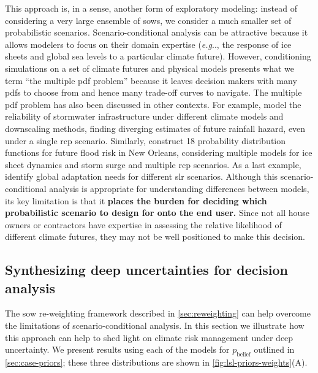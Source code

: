 \documentclass{agujournal2019}
\makeatletter
\DeclareRobustCommand\onedot{\futurelet\@let@token\@onedot}
\def\@onedot{\ifx\@let@token.\else.\null\fi\xspace}
\def\eg{\emph{e.g}\onedot} \def\Eg{\emph{E.g}\onedot}
\makeatother
\begin{document}
This approach is, in a sense, another form of exploratory modeling: instead of considering a very large ensemble of \glspl{sow}, we consider a much smaller set of probabilistic scenarios.
Scenario-conditional analysis can be attractive because it allows modelers to focus on their domain expertise (\eg, the response of ice sheets and global sea levels to a particular climate future).
However, conditioning simulations on a set of climate futures and physical models presents what we term ``the multiple \gls{pdf} problem'' because it leaves decision makers with many \glspl{pdf} to choose from and hence many trade-off curves to navigate.
The multiple \gls{pdf} problem has also been discussed in other contexts.
For example,  model the reliability of stormwater infrastructure under different climate models and downscaling methods, finding diverging estimates of future rainfall hazard, even under a single \gls{rcp} scenario.
Similarly,  construct 18 probability distribution functions for future flood risk in New Orleans, considering multiple models for ice sheet dynamics and storm surge and multiple \gls{rcp} scenarios. As a last example,  identify global adaptation needs for different \gls{slr} scenarios.
Although this scenario-conditional analysis is appropriate for understanding differences between models, its key limitation is that it \textbf{places the burden for deciding which probabilistic scenario to design for onto the end user.}
Since not all house owners or contractors have expertise in assessing the relative likelihood of different climate futures, they may not be well positioned to make this decision.

\subsection{Synthesizing deep uncertainties for decision analysis}\label{sec:results-synthesis}

The \gls{sow} re-weighting framework described in \cref{sec:reweighting} can help overcome the limitations of scenario-conditional analysis.
In this section we illustrate how this approach can help to shed light on climate risk management under deep uncertainty.
We present results using each of the models for $p_\mathrm{belief}$ outlined in \cref{sec:case-priors}; these three distributions are shown in \cref{fig:lsl-priors-weights}(A).
\end{document}
